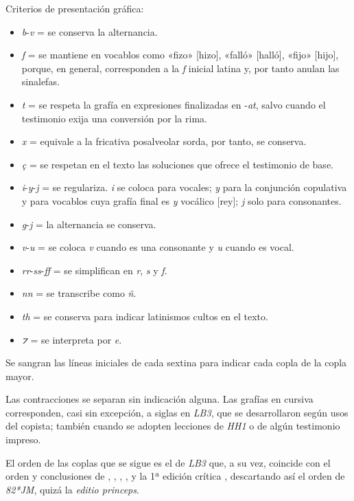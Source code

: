 \documentclass[11pt,a4paper,twoside]{article}
\newcommand{\comillas}[1]{«#1»}
\begin{document}
Criterios de presentación gráfica:
%
\begin{itemize}[label=--]%
\item \textit{b}-\textit{v} = se conserva la alternancia.
\item \textit{f} = se mantiene en vocablos como \comillas{fizo} [hizo], \comillas{falló} [halló], \comillas{fijo} [hijo], porque, en general, corresponden a la \textit{f} inicial latina y, por tanto anulan las sinalefas.
\item \textit{t} = se respeta la grafía en expresiones finalizadas en -\textit{at}, salvo cuando el testimonio exija una conversión por la rima.
\item \textit{x} = equivale a la fricativa posalveolar sorda, por tanto, se conserva.
\item \textit{ç} = se respetan en el texto las soluciones que ofrece el testimonio de base.
\item \textit{i}-\textit{y}-\textit{j} = se regulariza. \textit{i} se coloca para vocales; \textit{y} para la conjunción copulativa y para vocablos cuya grafía final es \textit{y} vocálico [rey]; \textit{j} solo para consonantes.
\item \textit{g}-\textit{j} = la alternancia se conserva.
\item \textit{v}-\textit{u} = se coloca \textit{v} cuando es una consonante y \textit{u} cuando es vocal.
\item \textit{rr}-\textit{ss}-\textit{ff} = se simplifican en \textit{r}, \textit{s} y \textit{f}.
\item \textit{nn} = se transcribe como \textit{ñ}.
\item \textit{th} = se conserva para indicar latinismos cultos en el texto.
\item \textit{⁊} = se interpreta por \textit{e}.%
\end{itemize}
%

Se sangran las líneas iniciales de cada sextina para indicar cada copla de la copla mayor.

Las contracciones se separan sin indicación alguna. Las grafías en cursiva corresponden, casi sin excepción, a siglas en \textit{LB3}, que se desarrollaron según usos del copista; también cuando se adopten lecciones de \textit{HH1} o de algún testimonio impreso.

El orden de las coplas que se sigue es el de \textit{LB3} que, a su vez, coincide con el orden y conclusiones de \textcite{Senabre1983}, \textcite{Palumbo1983}, \textcite{Orduna1967}, \textcite{Beltrán1991,Beltrán2013}, \textcite{PérezPriego1990,PérezPriego2017} y la 1ª edición crítica \parencite{Foulché-Delbosc1902}, descartando así el orden de \textit{82*JM}, quizá la \textit{editio princeps}.
\end{document}
